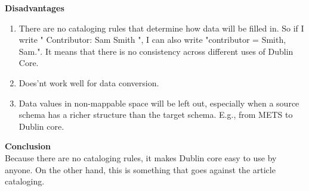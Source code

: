 \begin{enumerate}
	{\bf Disadvantages}
	\begin{enumerate}
		\item There are no cataloging rules that determine how data will be filled in. So if I write " Contributor: Sam Smith ", I can also write "contributor = Smith, Sam.". It means that there is no consistency across different uses of Dublin Core.
		\item Does'nt work well for data conversion.
		\item Data values in non-mappable space will be left out, especially when a source schema has a richer structure than the target schema. E.g., from METS to Dublin core.
	\end{enumerate}
	{\bf Conclusion}\\
	Because there are no cataloging rules, it makes Dublin core easy to use by anyone. On the other hand, this is something that goes against the article cataloging.
		
\end{enumerate}
	
\newpage %





